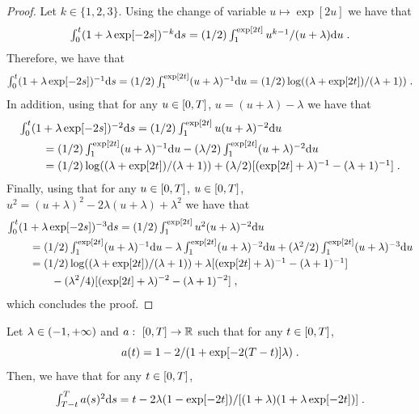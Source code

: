   \begin{proof}
    Let $k \in \{1, 2, 3\}$. Using the change of variable $u \mapsto \exp[2u]$
    we have that
    \begin{equation}
      \textstyle{\int_0^{t}(1 + \lambda \exp[-2s])^{-k} \mathrm{d}s = (1/2) \int_1^{\exp[2t]} u^{k-1} / (u + \lambda) \mathrm{d}u \;. }
    \end{equation}
    Therefore, we have that
    \begin{equation}
      \textstyle{\int_0^{t}(1 + \lambda \exp[-2s])^{-1} \mathrm{d}s = (1/2) \int_1^{\exp[2t]}  (u + \lambda)^{-1} \mathrm{d}u = (1/2)\log((\lambda + \exp[2t])/(\lambda +1)) \;. }
    \end{equation}
    In addition, using that for any $u \in \left[0,T\right]$, $u = (u + \lambda) - \lambda$ we have that
    \begin{align}
      &\textstyle{\int_0^{t}(1 + \lambda \exp[-2s])^{-2} \mathrm{d}s} = \textstyle{(1/2) \int_1^{\exp[2t]}  u(u + \lambda)^{-2} \mathrm{d}u } \\
      & \qquad = \textstyle{(1/2) \int_1^{\exp[2t]}  (u + \lambda)^{-1} \mathrm{d}u - (\lambda/2) \int_1^{\exp[2t]} (u + \lambda)^{-2} \mathrm{d}u } \\
      & \qquad = \textstyle{(1/2)\log((\lambda + \exp[2t])/(\lambda +1)) + (\lambda/2)[(\exp[2t] + \lambda)^{-1} - (\lambda + 1)^{-1}] } \; . 
    \end{align}
    Finally, using that for any $u \in \left[0,T\right]$, $u \in \left[0,T\right]$, $u^2 = (u + \lambda)^2 - 2\lambda(u+\lambda) + \lambda^2$ we have that
    \begin{align}
      &\textstyle{\int_0^{t}(1 + \lambda \exp[-2s])^{-3} \mathrm{d}s} = \textstyle{(1/2) \int_1^{\exp[2t]}  u^2(u + \lambda)^{-2} \mathrm{d}u } \\
      & \qquad = \textstyle{(1/2) \int_1^{\exp[2t]}  (u + \lambda)^{-1} \mathrm{d}u - \lambda \int_1^{\exp[2t]} (u + \lambda)^{-2} \mathrm{d}u + (\lambda^2/2) \int_1^{\exp[2t]} (u + \lambda)^{-3} \mathrm{d}u} \\
      & \qquad = \textstyle{(1/2) \log((\lambda + \exp[2t])/(\lambda +1)) + \lambda [(\exp[2t] + \lambda)^{-1} - (\lambda + 1)^{-1}] } \\
      & \qquad \qquad - (\lambda^2/4)[(\exp[2t] + \lambda)^{-2} - (\lambda + 1)^{-2}] \; ,
    \end{align}
    which concludes the proof.
  \end{proof}
  
\begin{lemma}
  \label{lemma:integral_duo}
  Let $\lambda \in \left(-1, +\infty\right)$ and $a: \ \left[0,T\right] \to \mathbb{R}$ such
  that for any $t \in \left[0,T\right]$,
  \begin{equation}
    a(t) = 1 - 2/(1 + \exp[-2(T-t)]\lambda) \; . 
  \end{equation}
  Then, we have that for any $t \in \left[0,T\right]$,  
  \begin{equation}
    \textstyle{\int_{T-t}^T a(s)^2 \mathrm{d}s} = t - 2\lambda(1 - \exp[-2t]) / [(1 + \lambda)(1 + \lambda \exp[-2t])] \; . 
  \end{equation}
  \end{lemma}
  
